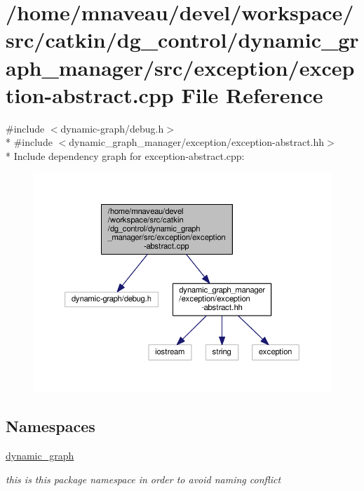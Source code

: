 \hypertarget{exception-abstract_8cpp}{}\section{/home/mnaveau/devel/workspace/src/catkin/dg\+\_\+control/dynamic\+\_\+graph\+\_\+manager/src/exception/exception-\/abstract.cpp File Reference}
\label{exception-abstract_8cpp}
{\ttfamily \#include $<$dynamic-\/graph/debug.\+h$>$}\\*
{\ttfamily \#include $<$dynamic\+\_\+graph\+\_\+manager/exception/exception-\/abstract.\+hh$>$}\\*
Include dependency graph for exception-\/abstract.cpp\+:\nopagebreak
\begin{figure}[H]
\begin{center}
\leavevmode
\includegraphics[width=350pt]{exception-abstract_8cpp__incl}
\end{center}
\end{figure}
\subsection*{Namespaces}
\begin{DoxyCompactItemize}
\item 
 \hyperlink{namespacedynamic__graph}{dynamic\+\_\+graph}
\begin{DoxyCompactList}\small\item\em this is this package namespace in order to avoid naming conflict \end{DoxyCompactList}\end{DoxyCompactItemize}
